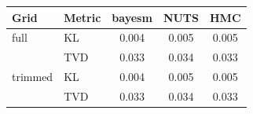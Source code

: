 \begin{tabular}{llccc}
\toprule
Grid & Metric & bayesm & NUTS & HMC \\
\midrule
full & KL & 0.004 & 0.005 & 0.005 \\
 & TVD & 0.033 & 0.034 & 0.033 \\
trimmed & KL & 0.004 & 0.005 & 0.005 \\
 & TVD & 0.033 & 0.034 & 0.033 \\
\bottomrule
\end{tabular}
